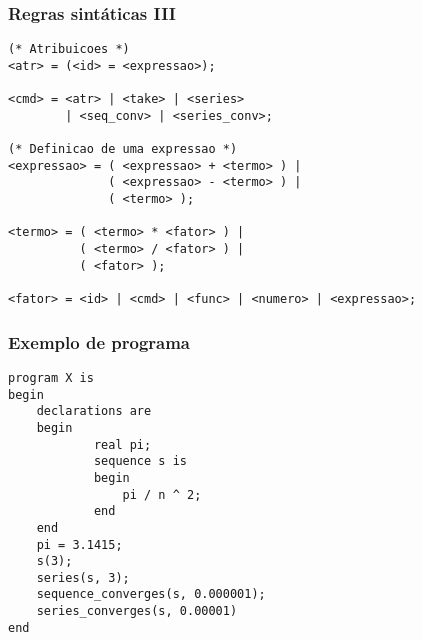 \documentclass{beamer}
\begin{document}
\begin{frame}[fragile]
\frametitle{Regras sint\'aticas III}
\begin{verbatim}
(* Atribuicoes *)
<atr> = (<id> = <expressao>);

<cmd> = <atr> | <take> | <series>
        | <seq_conv> | <series_conv>;

(* Definicao de uma expressao *)
<expressao> = ( <expressao> + <termo> ) |
              ( <expressao> - <termo> ) |
              ( <termo> );

<termo> = ( <termo> * <fator> ) |
          ( <termo> / <fator> ) |
          ( <fator> );

<fator> = <id> | <cmd> | <func> | <numero> | <expressao>;
\end{verbatim}
\end{frame}

\begin{frame}[fragile]
\frametitle{Exemplo de programa}
\begin{verbatim}
program X is
begin
    declarations are
    begin
            real pi;
            sequence s is
            begin
                pi / n ^ 2;
            end
    end
    pi = 3.1415;
    s(3);
    series(s, 3);
    sequence_converges(s, 0.000001);
    series_converges(s, 0.00001)
end
\end{verbatim}
\end{frame}
\end{document}
